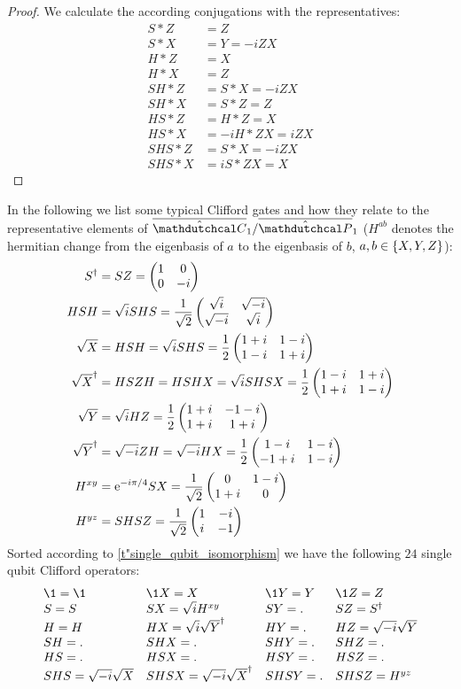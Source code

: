 \documentclass[a4paper,english]{scrartcl}
\begin{document}
\begin{proof}
We calculate the according conjugations with the representatives:
\begin{align}
  S*Z &= Z\\
  S*X &= Y = -iZX\\
  H*Z &= X\\
  H*X &= Z\\
  SH*Z &= S*X = -iZX\\
  SH*X &= S*Z = Z\\
  HS*Z &= H*Z = X\\
  HS*X &= -iH*ZX = iZX\\
  SHS*Z &= S*X = -iZX\\
  SHS*X &= iS*ZX = X
\end{align}
\end{proof}
\begin{remark}
In the following we list some typical Clifford gates and how they relate to the
representative elements of $\ouic_1/\ouip_1$ ($H^{ab}$ denotes the hermitian change from
the eigenbasis of $a$ to the eigenbasis of $b$, $a, b \in \bc{X, Y, Z}$):
\begin{align}
  S^\dagger &= SZ = \begin{pmatrix}1&0\\0&-i\end{pmatrix}\\
  HSH &= \sqrt{i}SHS = \frac{1}{\sqrt{2}}\begin{pmatrix}\sqrt{i}&\sqrt{-i}\\\sqrt{-i}&\sqrt{i}\end{pmatrix}\\
  \sqrt{X} &= HSH = \sqrt{i}SHS = \frac{1}{2}\begin{pmatrix}1+i&1-i\\1-i&1+i\end{pmatrix}\\
  \sqrt{X}^\dagger &= HSZH = HSHX = \sqrt{i}SHSX = \frac{1}{2}\begin{pmatrix}1-i&1+i\\1+i&1-i\end{pmatrix}\\
  \sqrt{Y} &= \sqrt{i}HZ = \frac{1}{2}\begin{pmatrix}1+i&-1-i\\1+i&1+i\end{pmatrix}\\
  \sqrt{Y}^\dagger &= \sqrt{-i}ZH = \sqrt{-i}HX = \frac{1}{2}\begin{pmatrix}1-i&1-i\\-1+i&1-i\end{pmatrix}\\
  H^{xy} &= \mathrm{e}^{-i\pi/4}SX = \frac{1}{\sqrt{2}}\begin{pmatrix}0&1-i\\1+i&0\end{pmatrix}\\
  H^{yz} &= SHSZ = \frac{1}{\sqrt{2}}\begin{pmatrix}1&-i\\i&-1\end{pmatrix}\\
\end{align}
Sorted according to \cref{t"single_qubit_isomorphism} we have the following $24$
single qubit Clifford operators:
\begin{align}
  \begin{array}{llll}
    \1 = \1 & \1X = X & \1Y = Y & \1Z = Z\\
    S = S & SX = \sqrt{i}H^{xy} & SY = . & SZ = S\ur\\
    H = H & HX =\sqrt{i}\sqrt{Y}\ur & HY = . & HZ = \sqrt{-i}\sqrt{Y}\\
    SH = . & SHX = . & SHY = . & SHZ = .\\
    HS = . & HSX = . & HSY = . & HSZ = .\\
    SHS = \sqrt{-i}\sqrt{X} & SHSX = \sqrt{-i}\sqrt{X}\ur & SHSY = . & SHSZ = H^{yz}
  \end{array}
\end{align}
\end{remark}
\end{document}
